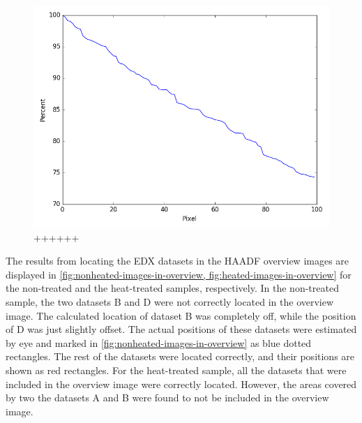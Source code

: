 \begin{figure}
	\includegraphics[width=0.7\linewidth]{fig/edx-sped-rectangle-match-graph.png}
	\caption{++++++}
	\label{fig:edx-sped-rectangle-match-graph}
\end{figure}

The results from locating the EDX datasets in the HAADF overview images are displayed in \cref{fig:nonheated-images-in-overview, fig:heated-images-in-overview} for the non-treated and the heat-treated samples, respectively. In the non-treated sample, the two datasets B and D were not correctly located in the overview image. The calculated location of dataset B was completely off, while the position of D was just slightly offset. The actual positions of these datasets were estimated by eye and marked in \cref{fig:nonheated-images-in-overview} as blue dotted rectangles. The rest of the datasets were located correctly, and their positions are shown as red rectangles. For the heat-treated sample, all the datasets that were included in the overview image were correctly located. However, the areas covered by two the datasets A and B were found to not be included in the overview image.


